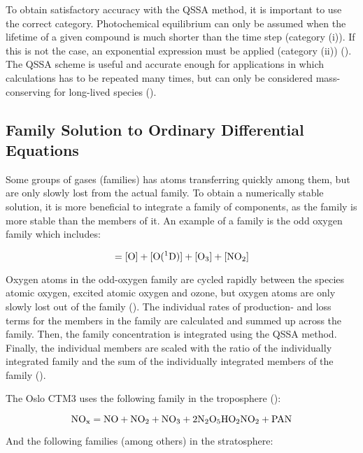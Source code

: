 To obtain satisfactory accuracy with the QSSA method, it is important to use the correct category. Photochemical equilibrium can only be assumed when the lifetime of a given compound is much shorter than the time step (category (i)). If this is not the case, an exponential expression must be applied (category (ii)) (\cite{Hesstvedt1978}). The QSSA scheme is useful and accurate enough for applications in which calculations has to be repeated many times, but can only  be considered mass-conserving for long-lived species (\cite{AtmModFund}). 

\subsection{Family Solution to Ordinary Differential Equations}\label{sec:families}

Some groups of gases (families) has atoms transferring quickly among them, but are only slowly lost from the actual family. To obtain a numerically stable solution, it is more beneficial to integrate a family of components, as the family is more stable than the members of it. An example of a family is the odd oxygen family which includes: 

\begin{equation*}
    [\chem{O_T}] = [\chem{O}] + [\chem{O(^1D})] + [\chem{O_3}] + [\chem{NO_2}]
\end{equation*}

Oxygen atoms in the odd-oxygen family are cycled rapidly between the species atomic oxygen, excited atomic oxygen and ozone, but oxygen atoms are only slowly lost out of the family (\cite{AtmModFund}). The individual rates of production- and loss terms for the members in the family are calculated and summed up across the family. Then, the family concentration is integrated using the QSSA method. Finally, the individual members are scaled with the ratio of the individually integrated family and the sum of the individually integrated members of the family (\cite{SovdeManual}).

\medskip

The Oslo CTM3 uses the following family in the troposphere (\cite{SovdeManual}): 

\begin{equation*}
    \mathrm{NO_x} = \mathrm{NO} + \mathrm{NO_2} + \mathrm{NO_3} + 2\mathrm{N_2O_5} \mathrm{HO_2NO_2} + \mathrm{PAN}    
\end{equation*}

And the following families (among others) in the stratosphere:

